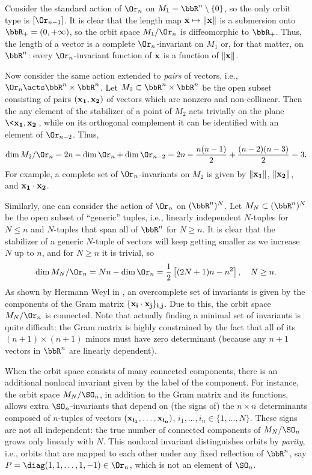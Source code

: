 \begin{example}
    Consider the standard action of $\Or_n$ on $M_1=\bbR^n\setminus\{0\}$, so the only orbit type is $[\Or_{n-1}]$. It is clear that the length map $\bf{x}\mapsto \lVert \bf{x}\rVert$ is a submersion onto $\bbR_+=(0,+\infty)$, so the orbit space $M_1\slash \Or_n$ is diffeomorphic to $\bbR_+$. Thus, the length of a vector is a complete $\Or_n$-invariant on $M_1$ or, for that matter, on $\bbR^n$: every $\Or_n$-invariant function of $\bf{x}$ is a function of $\lVert \bf{x}\rVert$.

    Now consider the same action extended to \emph{pairs} of vectors, i.e., $\Or_n\acts \bbR^n\times\bbR^n$. Let $M_2\subset \bbR^n\times\bbR^n$ be the open subset consisting of pairs $(\bf{x}_1,\bf{x}_2)$ of vectors which are nonzero and non-collinear. Then the any element of the stabilizer of a point of $M_2$ acts trivially on the plane $\<\bf{x}_1,\bf{x}_2\>$, while on its orthogonal complement it can be identified with an element of $\Or_{n-2}$. Thus,
    \[\dim M_2\slash \Or_n=2n-\dim \Or_n+\dim \Or_{n-2}=2n-\frac{n(n-1)}{2}+\frac{(n-2)(n-3)}{2}=3.\]
    For example, a complete set of $\Or_n$-invariants on $M_2$ is given by $\lVert \bf{x}_1\rVert$, $\lVert \bf{x}_2\rVert$, and $ \bf{x}_1\cdot\bf{x}_2$. 

    Similarly, one can consider the action of $\Or_n$ on $(\bbR^n)^N$. Let $M_N\subset (\bbR^n)^N$ be the open subset of ``generic'' tuples, i.e., linearly independent $N$-tuples for $N\leq n$ and $N$-tuples that span all of $\bbR^n$ for $N\geq n$. It is clear that the stabilizer of a generic $N$-tuple of vectors will keep getting smaller as we increase $N$ up to $n$, and for $N\geq n$ it is trivial, so 
    \[\dim M_N\slash \Or_n=Nn-\dim \Or_n=\frac12\left[(2N+1)n-n^2\right],\quad N\geq n.\]
    As shown by Hermann Weyl in \cite{Weyl}, an overcomplete set of invariants is given by the components of the Gram matrix $\{\bf{x}_i\cdot\bf{x}_j\}_{i,j}$. Due to this, the orbit space $M_N\slash \Or_n$ is connected. Note that actually finding a minimal set of invariants is quite difficult: the Gram matrix is highly constrained by the fact that all of its $(n+1)\times (n+1)$ minors must have zero determinant (because any $n+1$ vectors in $\bbR^n$ are linearly dependent). 

    When the orbit space consists of many connected components, there is an additional nonlocal invariant given by the label of the component. For instance, the orbit space $M_N\slash \SO_n$, in addition to the Gram matrix and its functions, allows extra $\SO_n$-invariants that depend on (the signs of) the $n\times n$ determinants composed of $n$-tuples of vectors $(\bf{x}_{i_1},\ldots,\bf{x}_{i_n})$, $i_1,\ldots,i_n\in \{1,\ldots,N\}$. These signs are not all independent: the true number of connected components of $M_N\slash \SO_n$ grows only linearly with $N$. This nonlocal invariant distinguishes orbits by \emph{parity}, i.e., orbits that are mapped to each other under any fixed reflection of $\bbR^n$, say $P=\diag(1,1,\ldots,1,-1)\in\Or_n$, which is not an element of $\SO_n$. 
    

\end{example}
